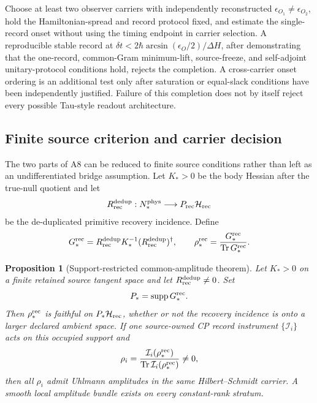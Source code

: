 \documentclass[11pt]{article}
\newtheorem{proposition}{Proposition}
\begin{document}
Choose at least two observer carriers with independently reconstructed
\(\epsilon_{O_1}\neq\epsilon_{O_2}\), hold the Hamiltonian-spread and record
protocol fixed, and estimate the single-record onset without using the timing
endpoint in carrier selection.  A reproducible stable record at
\(\delta t<2\hbar\arcsin(\epsilon_O/2)/\Delta H\), after demonstrating that
the one-record, common-Gram minimum-lift, source-freeze, and self-adjoint
unitary-protocol conditions hold, rejects the completion.  A
cross-carrier onset ordering is an additional test only after saturation or
equal-slack conditions have been independently justified.  Failure of this
completion does not by itself reject every possible Tau-style readout
architecture.

\subsection{Finite source criterion and carrier decision}
\label{sec:a8-source-carrier}

The two parts of A8 can be reduced to finite source conditions rather than
left as an undifferentiated bridge assumption.  Let \(K_*>0\) be the body
Hessian after the true-null quotient and let
\[
 R_{\rm rec}^{\rm dedup}:N_*^{\rm phys}\longrightarrow
 P_{\rm rec}\mathcal H_{\rm rec}
\]
be the de-duplicated primitive recovery incidence.  Define
\begin{equation}
 G_*^{\rm rec}
 =R_{\rm rec}^{\rm dedup}K_*^{-1}
 (R_{\rm rec}^{\rm dedup})^\dagger,
 \qquad
 \rho_*^{\rm rec}
 =\frac{G_*^{\rm rec}}{\operatorname{Tr}G_*^{\rm rec}}.
 \label{eq:a8-faithful-source-state}
\end{equation}

\begin{proposition}[Support-restricted common-amplitude theorem]
Let \(K_*>0\) on a finite retained source tangent space and let
\(R_{\rm rec}^{\rm dedup}\ne0\).  Set
\begin{equation}
 P_*=\operatorname{supp}G_*^{\rm rec}.
 \label{eq:a8-occupied-support}
\end{equation}
Then \(\rho_*^{\rm rec}\) is faithful on
\(P_*\mathcal H_{\rm rec}\), whether or not the recovery incidence is onto a
larger declared ambient space.  If one source-owned CP record instrument
\(\{\mathcal I_i\}\) acts on this occupied support and
\begin{equation}
 \rho_i=\frac{\mathcal I_i(\rho_*^{\rm rec})}{\operatorname{Tr}\mathcal I_i(\rho_*^{\rm rec})}\ne0,
 \label{eq:a8-record-instrument}
\end{equation}
then all \(\rho_i\) admit Uhlmann amplitudes in the same
Hilbert--Schmidt carrier.  A smooth local amplitude bundle exists on every
constant-rank stratum.
\end{proposition}
\end{document}
